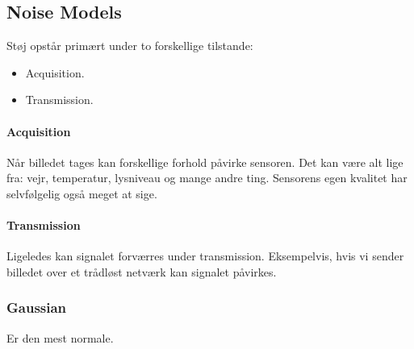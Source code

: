 \subsection{Noise Models}

Støj opstår primært under to forskellige tilstande:

\begin{itemize}
	\item Acquisition.
	\item Transmission.
\end{itemize}

\paragraph{Acquisition}

Når billedet tages kan forskellige forhold påvirke sensoren. Det kan være alt lige fra: vejr, temperatur, lysniveau og mange andre ting. Sensorens egen kvalitet har selvfølgelig også meget at sige. 

\paragraph{Transmission}

Ligeledes kan signalet forværres under transmission. Eksempelvis, hvis vi sender billedet over et trådløst netværk kan signalet påvirkes.

\subsubsection{Gaussian}

Er den mest normale. 

